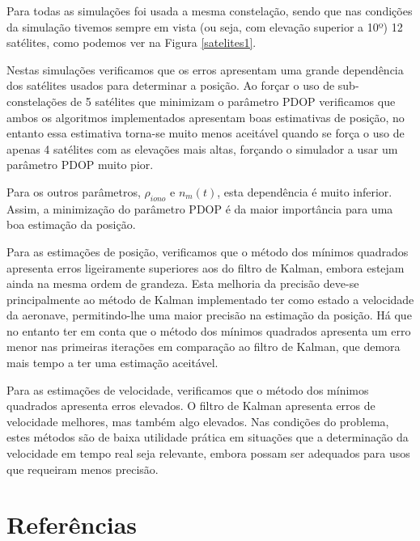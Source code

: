 \documentclass[palatino]{ist-report}
\begin{document}
Para todas as simulações foi usada a mesma constelação, sendo que nas condições da simulação tivemos sempre em vista (ou seja, com elevação superior a 10º) 12 satélites, como podemos ver na Figura \ref{satelites1}.

Nestas simulações verificamos que os erros apresentam uma grande dependência dos satélites usados para determinar a posição. Ao forçar o uso de sub-constelações de 5 satélites que minimizam o parâmetro PDOP verificamos que ambos os algoritmos implementados apresentam boas estimativas de posição, no entanto essa estimativa torna-se muito menos aceitável quando se força o uso de apenas 4 satélites com as elevações mais altas, forçando o simulador a usar um parâmetro PDOP muito pior.  

Para os outros parâmetros, $\rho_{iono}$ e $n_{m}(t)$, esta dependência é muito inferior. Assim, a minimização do parâmetro PDOP é da maior importância para uma boa estimação da posição.

Para as estimações de posição, verificamos que o método dos mínimos quadrados apresenta erros ligeiramente superiores aos do filtro de Kalman, embora estejam ainda na mesma ordem de grandeza. Esta melhoria da precisão deve-se principalmente ao método de Kalman implementado ter como estado a velocidade da aeronave, permitindo-lhe uma maior precisão na estimação da posição. Há que no entanto ter em conta que o método dos mínimos quadrados apresenta um erro menor nas primeiras iterações em comparação ao filtro de Kalman, que demora mais tempo a ter uma estimação aceitável.

Para as estimações de velocidade, verificamos que o método dos mínimos quadrados apresenta erros elevados. O filtro de Kalman apresenta erros de velocidade melhores, mas também algo elevados. Nas condições do problema, estes métodos são de baixa utilidade prática em situações que a determinação da velocidade em tempo real seja relevante, embora possam ser adequados para usos que requeiram menos precisão.

\pagebreak
\section{Referências}
\nocite{*}
 \printbibliography

\pagebreak
\appendix

\end{document}

